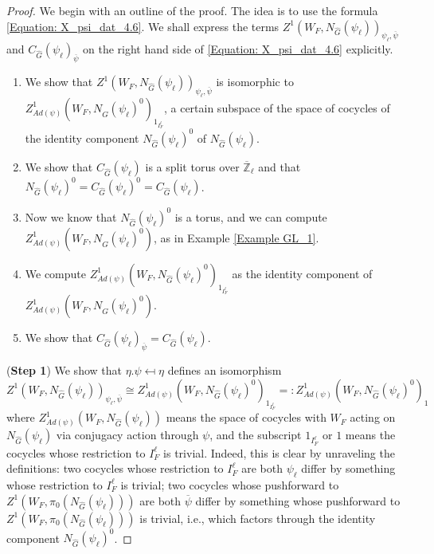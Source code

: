 \begin{theorem}
    \begin{proof}
    	We begin with an outline of the proof. The idea is to use the formula \eqref{Equation: X_psi_dat_4.6}. We shall express the terms $Z^1(W_F, N_{\hat{G}}(\psi_{\ell}))_{\psi_{\ell}, \overline{\psi}}$ and $C_{\hat{G}}(\psi_{\ell})_{\overline{\psi}}$ on the right hand side of \eqref{Equation: X_psi_dat_4.6} explicitly. 
    	\begin{enumerate}
    		\item We show that $Z^1(W_F, N_{\hat{G}}(\psi_{\ell}))_{\psi_{\ell}, \overline{\psi}}$ is isomorphic to $Z^1_{Ad(\psi)}(W_F, N_{\hat{G}}(\psi_{\ell})^0)_{1_{I_F^{\ell}}}$, a certain subspace of the space of cocycles of the identity component $N_{\hat{G}}(\psi_{\ell})^0$ of $N_{\hat{G}}(\psi_{\ell})$.
    		\item We show that $C_{\hat{G}}(\psi_{\ell})$ is a split torus over $\overline{\mathbb{Z}}_{\ell}$ and that
            $N_{\hat{G}}(\psi_{\ell})^0=C_{\hat{G}}(\psi_{\ell})^0=C_{\hat{G}}(\psi_{\ell})$.
            \item Now we know that $N_{\hat{G}}(\psi_{\ell})^0$ is a torus, and we can compute $Z^1_{Ad(\psi)}(W_F, N_{\hat{G}}(\psi_{\ell})^0)$, as in Example \ref{Example GL_1}.
            \item We compute $Z^1_{Ad(\psi)}(W_F, N_{\hat{G}}(\psi_{\ell})^0)_{1_{I_F^{\ell}}}$ as the identity component of $Z^1_{Ad(\psi)}(W_F, N_{\hat{G}}(\psi_{\ell})^0)$.
            \item We show that $C_{\hat{G}}(\psi_{\ell})_{\overline{\psi}}=C_{\hat{G}}(\psi_{\ell})$.
    	\end{enumerate}  
    	
   
    	
    	(\textbf{Step 1}) We show that $\eta.\psi \mapsfrom \eta$ defines an isomorphism
    	$$Z^1(W_F, N_{\hat{G}}(\psi_{\ell}))_{\psi_{\ell}, \overline{\psi}} \cong Z^1_{Ad(\psi)}(W_F, N_{\hat{G}}(\psi_{\ell})^0)_{1_{I_F^{\ell}}}=:Z^1_{Ad(\psi)}(W_F, N_{\hat{G}}(\psi_{\ell})^0)_1$$
    	where $Z^1_{Ad(\psi)}(W_F, N_{\hat{G}}(\psi_{\ell}))$ means the space of cocycles with $W_F$ acting on $N_{\hat{G}}(\psi_{\ell})$ via conjugacy action through $\psi$, and the subscript $1_{I_F^{\ell}}$ or $1$ means the cocycles whose restriction to $I_F^{\ell}$ is trivial. 
    	Indeed, this is clear by unraveling the definitions: two cocycles whose restriction to $I_F^\ell$ are both $\psi_{\ell}$ differ by something whose restriction to $I_F^{\ell}$ is trivial; two cocycles whose pushforward to $Z^1(W_F, \pi_0(N_{\hat{G}}(\psi_{\ell})))$ are both $\overline{\psi}$ differ by something whose pushforward to $Z^1(W_F, \pi_0(N_{\hat{G}}(\psi_{\ell})))$ is trivial, i.e., which factors through the identity component $N_{\hat{G}}(\psi_{\ell})^0$.
    	

\end{proof}
\end{theorem}
